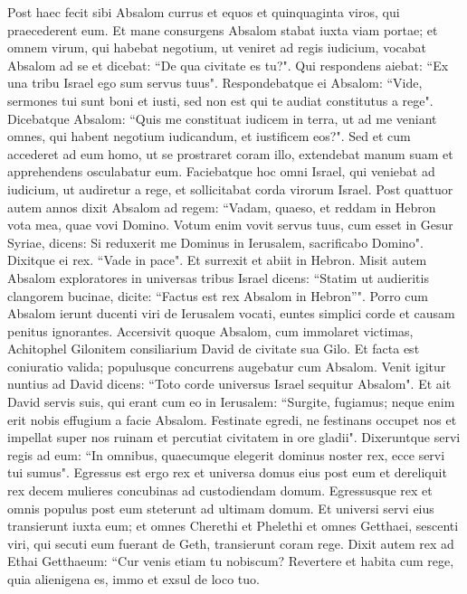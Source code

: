 \begin{biblechapter}  
\verse Post haec fecit sibi Absalom currus et equos et quinquaginta viros, qui praecederent eum. 
\verse Et mane consurgens Absalom stabat iuxta viam portae; et omnem virum, qui habebat negotium, ut veniret ad regis iudicium, vocabat Absalom ad se et dicebat: “De qua civitate es tu?". Qui respondens aiebat: “Ex una tribu Israel ego sum servus tuus". 
\verse Respondebatque ei Absalom: “Vide, sermones tui sunt boni et iusti, sed non est qui te audiat constitutus a rege". Dicebatque Absalom: 
\verse “Quis me constituat iudicem in terra, ut ad me veniant omnes, qui habent negotium iudicandum, et iustificem eos?". 
\verse Sed et cum accederet ad eum homo, ut se prostraret coram illo, extendebat manum suam et apprehendens osculabatur eum. 
\verse Faciebatque hoc omni Israel, qui veniebat ad iudicium, ut audiretur a rege, et sollicitabat corda virorum Israel. 
\verse Post quattuor autem annos dixit Absalom ad regem: “Vadam, quaeso, et reddam in Hebron vota mea, quae vovi Domino. 
\verse Votum enim vovit servus tuus, cum esset in Gesur Syriae, dicens: Si reduxerit me Dominus in Ierusalem, sacrificabo Domino". 
\verse Dixitque ei rex. “Vade in pace". Et surrexit et abiit in Hebron. 
\verse Misit autem Absalom exploratores in universas tribus Israel dicens: “Statim ut audieritis clangorem bucinae, dicite: “Factus est rex Absalom in Hebron”".  
\verse Porro cum Absalom ierunt ducenti viri de Ierusalem vocati, euntes simplici corde et causam penitus ignorantes. 
\verse Accersivit quoque Absalom, cum immolaret victimas, Achitophel Gilonitem consiliarium David de civitate sua Gilo. Et facta est coniuratio valida; populusque concurrens augebatur cum Absalom. 
\verse Venit igitur nuntius ad David dicens: “Toto corde universus Israel sequitur Absalom". 
\verse Et ait David servis suis, qui erant cum eo in Ierusalem: “Surgite, fugiamus; neque enim erit nobis effugium a facie Absalom. Festinate egredi, ne festinans occupet nos et impellat super nos ruinam et percutiat civitatem in ore gladii". 
\verse Dixeruntque servi regis ad eum: “In omnibus, quaecumque elegerit dominus noster rex, ecce servi tui sumus". 
\verse Egressus est ergo rex et universa domus eius post eum et dereliquit rex decem mulieres concubinas ad custodiendam domum. 
\verse Egressusque rex et omnis populus post eum steterunt ad ultimam domum. 
\verse Et universi servi eius transierunt iuxta eum; et omnes Cherethi et Phelethi et omnes Getthaei, sescenti viri, qui secuti eum fuerant de Geth, transierunt coram rege. 
\verse Dixit autem rex ad Ethai Getthaeum: “Cur venis etiam tu nobiscum? Revertere et habita cum rege, quia alienigena es, immo et exsul de loco tuo. 

\end{biblechapter}
